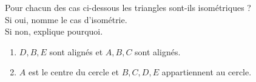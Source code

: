 %
%
    Pour chacun des cas ci-dessous les triangles sont-ils isométriques ?\\
    Si oui, nomme le cas d'isométrie.\\
    Si non, explique pourquoi.\\
    \begin{enumerate}[cols=2]
        \item $D,B,E$ sont alignés et $A,B,C$ sont alignés.\\
        \item $A$ est le centre du cercle et $B,C,D,E$ appartiennent au cercle.\\
    \end{enumerate}
